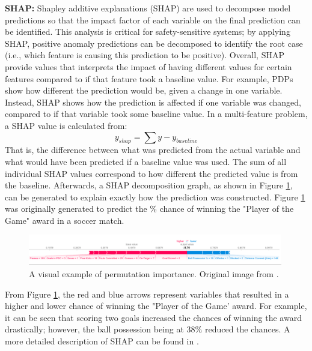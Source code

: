 \textbf{SHAP:} Shapley additive explanations (SHAP) are used to decompose model predictions so that the impact factor of each variable on the final prediction can be identified.  This analysis is critical for safety-sensitive systems; by applying SHAP, positive anomaly predictions can be decomposed to identify the root case (i.e., which feature is causing this prediction to be positive).  Overall, SHAP provide values that interprets the impact of having different values for certain features compared to if that feature took a baseline value.  For example, PDPs show how different the prediction would be, given a change in one variable. Instead, SHAP shows how the prediction is affected if one variable was changed, compared to if that variable took some baseline value.  In a multi-feature problem, a SHAP value is calculated from:
\begin{equation}
    y_{shap} = \sum y - y_{baseline}
    \label{eq:03SHAP}
\end{equation}
That is, the difference between what was predicted from the actual variable and what would have been predicted if a baseline value was used. The sum of all individual SHAP values correspond to how different the predicted value is from the baseline. Afterwards, a SHAP decomposition graph, as shown in Figure \ref{fig:03SHAPFig}, can be generated to explain exactly how the prediction was constructed.  Figure \ref{fig:03SHAPFig} was originally generated to predict the \% chance of winning the "Player of the Game" award in a soccer match.

\begin{figure}[H]
    \centering
    \includegraphics[width=0.99\textwidth]{images/ch3/SHAP.jpeg}
    \caption{A visual example of permutation importance. Original image from \cite{SHAP_plot}.}
    \label{fig:03SHAPFig}
\end{figure}

From Figure \ref{fig:03SHAPFig}, the red and blue arrows represent variables that resulted in a higher and lower chance of winning the "Player of the Game' award. For example, it can be seen that scoring two goals increased the chances of winning the award drastically; however, the ball possession being at 38\% reduced the chances. A more detailed description of SHAP can be found in \cite{SHAP}.


